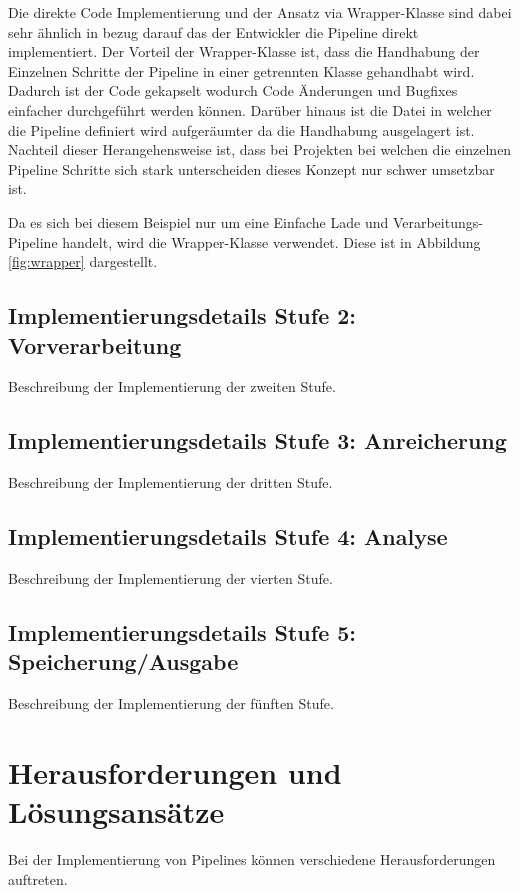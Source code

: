 \documentclass[a4paper]{article} %
\begin{document}
Die direkte Code Implementierung und der Ansatz via Wrapper-Klasse sind dabei sehr ähnlich in bezug darauf das der Entwickler die Pipeline direkt implementiert. Der Vorteil der Wrapper-Klasse ist, dass die Handhabung der Einzelnen Schritte der Pipeline in einer getrennten Klasse gehandhabt wird. Dadurch ist der Code gekapselt wodurch Code Änderungen und Bugfixes einfacher durchgeführt werden können. Darüber hinaus ist die Datei in welcher die Pipeline definiert wird aufgeräumter da die Handhabung ausgelagert ist. Nachteil dieser Herangehensweise ist, dass bei Projekten bei welchen die einzelnen Pipeline Schritte sich stark unterscheiden dieses Konzept nur schwer umsetzbar ist.

Da es sich bei diesem Beispiel nur um eine Einfache Lade und Verarbeitungs-Pipeline handelt, wird die Wrapper-Klasse verwendet. Diese ist in Abbildung \ref{fig:wrapper} dargestellt.


\subsection{Implementierungsdetails Stufe 2: Vorverarbeitung}
Beschreibung der Implementierung der zweiten Stufe.
\blindtext[2]
\lipsum[12]

\subsection{Implementierungsdetails Stufe 3: Anreicherung}
Beschreibung der Implementierung der dritten Stufe.
\blindtext[2]
\lipsum[13-14]

\subsection{Implementierungsdetails Stufe 4: Analyse}
Beschreibung der Implementierung der vierten Stufe.
\blindtext[2]
\lipsum[15-16]

\subsection{Implementierungsdetails Stufe 5: Speicherung/Ausgabe}
Beschreibung der Implementierung der fünften Stufe.
\blindtext[2]
\lipsum[17-18]


\section{Herausforderungen und Lösungsansätze}
Bei der Implementierung von Pipelines können verschiedene Herausforderungen auftreten.
\end{document}
